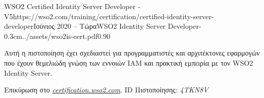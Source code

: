 \documentclass{mycv}
\begin{document}
	\vspace{0.75cm}
	
	\begin{EntryDatedLogo}{WSO2 Certified Identity Server
			Developer - V5}{https://wso2.com/training/certification/certified-identity-server-developer}{Ιούνιος 2020 -- Τώρα}{WSO2 Identity Server Developer}{-0.3cm}{../assets/wso2is-cert.pdf}{0.90}
		\begin{Itemize}
			\item Αυτή η πιστοποίηση έχει σχεδιαστεί για προγραμματιστές και αρχιτέκτονες εφαρμογών που έχουν θεμελιώδη γνώση των εννοιών IAM και πρακτική εμπειρία με τον WSO2 Ιdentity Server. 
			\item Επικύρωση στο \href{https://certification.wso2.com}{\textit{certification.wso2.com}}. ID Πιστοποίησης: \textit{4TKN8V}
		\end{Itemize}
	\end{EntryDatedLogo}


	

\end{document}
